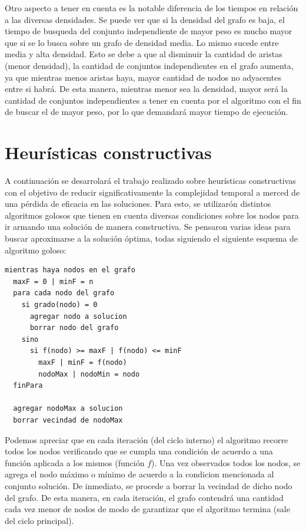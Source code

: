 \documentclass[a4paper,11pt] {article}
\begin{document}
Otro aspecto a tener en cuenta es la notable diferencia de los tiempos en relaci\'on a las diversas densidades. Se puede ver que si la densidad del grafo es baja, el tiempo de busqueda del conjunto independiente de mayor peso es mucho mayor que si se lo busca sobre un grafo de densidad media. Lo mismo sucede entre media y alta densidad. Esto se debe a que al disminuir la cantidad de aristas (menor densidad), la cantidad de conjuntos independientes en el grafo aumenta, ya que mientras menos aristas haya, mayor cantidad de nodos no adyacentes entre si habr\'a. De esta manera, mientras menor sea la densidad, mayor ser\'a la cantidad de conjuntos independientes a tener en cuenta por el algoritmo con el fin de buscar el de mayor peso, por lo que demandar\'a mayor tiempo de ejecuci\'on.

\bigskip

\section{Heur\'isticas constructivas}

A continuaci\'on se desarrolar\'a el trabajo realizado sobre heur\'isticas constructivas con el objetivo de reducir significativamente la complejidad temporal a merced de una p\'erdida de eficacia en las soluciones. Para esto, se utilizar\'on distintos algoritmos golosos que tienen en cuenta diversas condiciones sobre los nodos para ir armando una soluci\'on de manera constructiva. Se pensaron varias ideas para buscar aproximarse a la soluci\'on \'optima, todas siguiendo el siguiente esquema de algoritmo goloso:

\begin{verbatim}
mientras haya nodos en el grafo
  maxF = 0 | minF = n
  para cada nodo del grafo
    si grado(nodo) = 0
      agregar nodo a solucion
      borrar nodo del grafo
    sino
      si f(nodo) >= maxF | f(nodo) <= minF
        maxF | minF = f(nodo)
        nodoMax | nodoMin = nodo
  finPara

  agregar nodoMax a solucion
  borrar vecindad de nodoMax
\end{verbatim}

Podemos apreciar que en cada iteraci\'on (del ciclo interno) el algoritmo recorre todos los nodos verificando que se cumpla una condici\'on de acuerdo a una funci\'on aplicada a los mismos (funci\'on $f$). Una vez observados todos los nodos, se agrega el nodo m\'aximo o m\'inimo de acuerdo a la condicion mencionada al conjunto soluci\'on. De inmediato, se procede a borrar la vecindad de dicho nodo del grafo. De esta manera, en cada iteraci\'on, el grafo contendr\'a una cantidad cada vez menor de nodos de modo de garantizar que el algoritmo termina (sale del ciclo principal).
\end{document}
